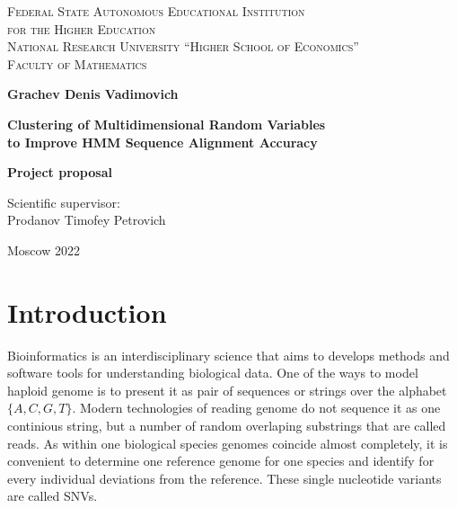 \documentclass[a4paper, 12pt]{article}
\theoremstyle{definition}
\theoremstyle{definition}
\theoremstyle{remark}
\begin{document}
\begin{center}
{\scshape Federal State Autonomous Educational Institution\\
for the Higher Education\\
National Research University ``Higher School of Economics''\\[1ex]
Faculty of Mathematics\par}

\par\vfill

\textbf{\large Grachev Denis Vadimovich}

\vspace{1.5cm}

{\Large\bfseries
Clustering of Multidimensional Random Variables \\ to Improve HMM Sequence Alignment Accuracy
\par}

\vspace{1.5cm}

\textbf{\large Project proposal}

\vspace{1cm}

\par\vfill
\noindent\parbox[t]{0.48\textwidth}{%
Scientific supervisor:\\[3pt]
Prodanov Timofey Petrovich
}
\par\vfill\vfill
Moscow 2022
\end{center}
\thispagestyle{empty}
\pagebreak

\tableofcontents
\newpage

\section{Introduction}
Bioinformatics is an interdisciplinary science that aims 
to develops methods and software tools 
for understanding biological data. 
One of the ways to model haploid genome is to present it as 
pair of sequences or strings over the alphabet $\{ A, C, G, T \}$. 
Modern technologies of reading genome do not sequence it as one 
continious string, but a number of random overlaping substrings 
that are called reads. 
As within one biological species genomes coincide almost completely, 
it is convenient to determine one reference genome for one species 
and identify for every individual deviations from the reference.
These single nucleotide variants are called SNVs.  
\end{document}
